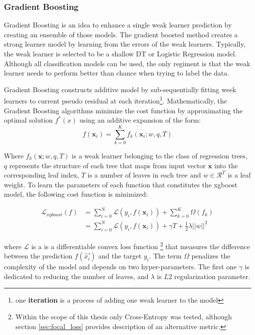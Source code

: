\subsubsection{Gradient Boosting}

Gradient Boosting is an idea to enhance a single weak learner prediction by creating an ensemble of those models. The gradient boosted method creates a strong learner model by learning from the errors of the weak learners. Typically, the weak learner is selected to be a shallow DT or Logistic Regression model. Although all classification models can be used, the only regiment is that the weak learner needs to perform better than chance when trying to label the data.     

Gradient Boosting constructs additive model by sub-sequentially fitting week learners to current pseudo residual at each iteration\footnote{one \textbf{iteration} is a process of adding one weak learner to the model}. Mathematically, the Gradient Boosting algorithms minimize the cost function by approximating the optimal solution $f^*(x)$ using an additive expansion of the form:
\begin{equation} 
    f(\textbf{x}_i) = \sum_{k=0}^{K} f_k(\textbf{x}_i; w, q, T)
\end{equation}

Where $f_k(\textbf{x}; w, q, T)$ is a weak learner belonging to the class of regression trees, $q$ represents the structure of each tree that maps from input vector $\textbf{x}$ into the corresponding leaf index, $T$ is a number of leaves in each tree and $w \in \mathcal{R}^{T}$ is a leaf weight. To learn the parameters of each function that constitutes the xgboost model, the following cost function is minimized:

\begin{equation}
\label{eq:xgboost_loss}
\begin{split}
    \mathcal{L}_{xgboost}(f) &= \sum_{i=0}^{N} \mathcal{L}(y_i, f(\mathbf{x}_i)) + \sum_{k=0}^{K}\Omega(f_{k})  \\ 
&= \sum_{i=0}^{N} \mathcal{L}(y_i, f(\mathbf{x}_i))  + \gamma T +\frac{1}{2}\lambda ||w||^{2}
\end{split}
\end{equation}

where $\mathcal{L}$ is a is a differentiable convex loss function \footnote{Within the scope of this thesis only Cross-Entropy was tested, although section \ref{sec:focal_loss} provides description of an alternative metric.} that measures the difference between the prediction $f(\vec{x_i})$ and the target $y_i$. 
The term $\Omega$ penalizes the complexity of the model and depends on two hyper-parameters. The first one $\gamma$ is dedicated to reducing the number of leaves, and $\lambda$ is $L2$ regularization parameter. 

